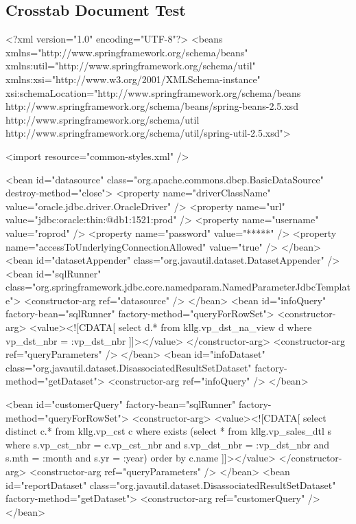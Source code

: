 \documentclass[letterpaper,10pt]{article}
\begin{document}
\subsection{Crosstab Document Test}
\begin{verbatimtab}
 <?xml version="1.0" encoding="UTF-8"?>
<beans xmlns="http://www.springframework.org/schema/beans"
	xmlns:util="http://www.springframework.org/schema/util" 
	xmlns:xsi="http://www.w3.org/2001/XMLSchema-instance"
	xsi:schemaLocation="http://www.springframework.org/schema/beans
           http://www.springframework.org/schema/beans/spring-beans-2.5.xsd
           http://www.springframework.org/schema/util
           http://www.springframework.org/schema/util/spring-util-2.5.xsd">

	<import resource="common-styles.xml" />

<bean id="datasource" class="org.apache.commons.dbcp.BasicDataSource"
	destroy-method="close">
	<property name="driverClassName" value="oracle.jdbc.driver.OracleDriver" />
	<property name="url" value="jdbc:oracle:thin:@db1:1521:prod" />
	<property name="username" value="roprod" />
	<property name="password" value="*****" />
	<property name="accessToUnderlyingConnectionAllowed" value="true" />
</bean>
<bean id="datasetAppender" class="org.javautil.dataset.DatasetAppender" />
<bean id="sqlRunner"
	class="org.springframework.jdbc.core.namedparam.NamedParameterJdbcTemplate">
	<constructor-arg ref="datasource" />
</bean>
<bean id="infoQuery" factory-bean="sqlRunner" factory-method="queryForRowSet">
	<constructor-arg>
	<value><![CDATA[ 
	select d.* from kllg.vp_dst_na_view d where vp_dst_nbr = :vp_dst_nbr
	]]></value>
	</constructor-arg>
	<constructor-arg ref="queryParameters" />
</bean>
<bean id="infoDataset" class="org.javautil.dataset.DisassociatedResultSetDataset"
	factory-method="getDataset">
	<constructor-arg ref="infoQuery" />
</bean>

<bean id="customerQuery" factory-bean="sqlRunner" factory-method="queryForRowSet">
	<constructor-arg>
		<value><![CDATA[ 
	select distinct c.* from kllg.vp_cst c	
	where exists (select * from kllg.vp_sales_dtl s where s.vp_cst_nbr = c.vp_cst_nbr and
	s.vp_dst_nbr = :vp_dst_nbr and s.mth = :month and s.yr = :year) order by c.name
	]]></value>
	</constructor-arg>
	<constructor-arg ref="queryParameters" />
</bean>
<bean id="reportDataset" class="org.javautil.dataset.DisassociatedResultSetDataset"
	factory-method="getDataset">
	<constructor-arg ref="customerQuery" />
</bean>


\end{verbatimtab}
\end{document}
